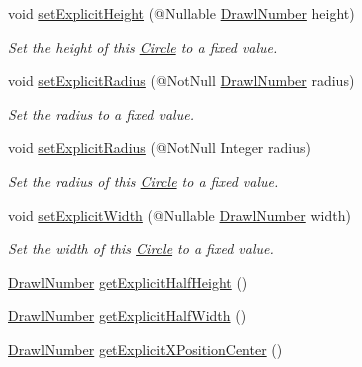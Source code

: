 \begin{DoxyCompactItemize}
void \hyperlink{classcom_1_1aarrelaakso_1_1drawl_1_1_circle_ab9d522fa3ba3c5ba770486a89d321159}{set\+Explicit\+Height} (@Nullable \hyperlink{classcom_1_1aarrelaakso_1_1drawl_1_1_drawl_number}{Drawl\+Number} height)
\begin{DoxyCompactList}\small\item\em Set the height of this \hyperlink{classcom_1_1aarrelaakso_1_1drawl_1_1_circle}{Circle} to a fixed value. \end{DoxyCompactList}\item 
void \hyperlink{classcom_1_1aarrelaakso_1_1drawl_1_1_circle_ab488257bdd425addecb822c45ed659ba}{set\+Explicit\+Radius} (@Not\+Null \hyperlink{classcom_1_1aarrelaakso_1_1drawl_1_1_drawl_number}{Drawl\+Number} radius)
\begin{DoxyCompactList}\small\item\em Set the radius to a fixed value. \end{DoxyCompactList}\item 
void \hyperlink{classcom_1_1aarrelaakso_1_1drawl_1_1_circle_af34a59acf0e1fc33777aca1b9be7b23d}{set\+Explicit\+Radius} (@Not\+Null Integer radius)
\begin{DoxyCompactList}\small\item\em Set the radius of this \hyperlink{classcom_1_1aarrelaakso_1_1drawl_1_1_circle}{Circle} to a fixed value. \end{DoxyCompactList}\item 
void \hyperlink{classcom_1_1aarrelaakso_1_1drawl_1_1_circle_a685203081a4d1f1065b714d215f2fcc2}{set\+Explicit\+Width} (@Nullable \hyperlink{classcom_1_1aarrelaakso_1_1drawl_1_1_drawl_number}{Drawl\+Number} width)
\begin{DoxyCompactList}\small\item\em Set the width of this \hyperlink{classcom_1_1aarrelaakso_1_1drawl_1_1_circle}{Circle} to a fixed value. \end{DoxyCompactList}\item 
\hyperlink{classcom_1_1aarrelaakso_1_1drawl_1_1_drawl_number}{Drawl\+Number} \hyperlink{classcom_1_1aarrelaakso_1_1drawl_1_1_shape_a7207aa8ba07ed18af81fb9d92a979cd6}{get\+Explicit\+Half\+Height} ()
\item 
\hyperlink{classcom_1_1aarrelaakso_1_1drawl_1_1_drawl_number}{Drawl\+Number} \hyperlink{classcom_1_1aarrelaakso_1_1drawl_1_1_shape_af952f32cb1706da71c9cb75916f4d665}{get\+Explicit\+Half\+Width} ()
\item 
\hyperlink{classcom_1_1aarrelaakso_1_1drawl_1_1_drawl_number}{Drawl\+Number} \hyperlink{classcom_1_1aarrelaakso_1_1drawl_1_1_shape_aaecae2f51794b77ff2f76b1be64b0d90}{get\+Explicit\+X\+Position\+Center} ()

\end{DoxyCompactItemize}

